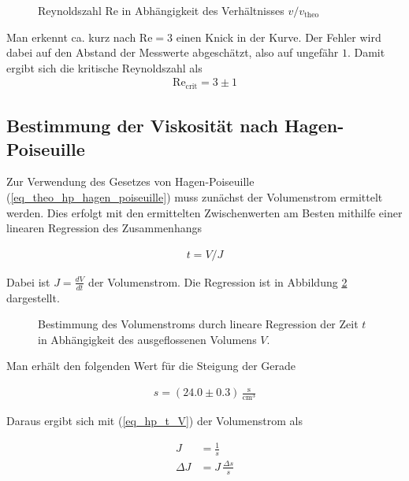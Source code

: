 \documentclass[12pt,a4paper,german]{scrartcl}
\numberwithin{equation}{section}
\begin{document}
  \begin{figure}[h]
    \centering
    \resizebox{0.9\textwidth}{!}{
      
    }
    \caption{Reynoldszahl Re in Abhängigkeit des Verhältnisses $v / v_\text{theo}$}
    \label{fig_reynolds}
  \end{figure}

  Man erkennt ca. kurz nach $\text{Re} = 3$ einen Knick in der Kurve. Der Fehler wird dabei auf den Abstand der Messwerte abgeschätzt, also auf ungefähr $1$. Damit ergibt sich die kritische Reynoldszahl als
  \begin{align}
    \text{Re}_\text{crit} = 3 \pm 1
  \end{align}

  \subsection{Bestimmung der Viskosität nach Hagen-Poiseuille}
  Zur Verwendung des Gesetzes von Hagen-Poiseuille (\ref{eq_theo_hp_hagen_poiseuille}) muss zunächst der Volumenstrom ermittelt werden.
  Dies erfolgt mit den ermittelten Zwischenwerten am Besten mithilfe einer linearen Regression des Zusammenhangs

  \begin{align}
    t = V / J
    \label{eq_hp_t_V}
  \end{align}

  Dabei ist $J = \frac{d V}{d t}$ der Volumenstrom. Die Regression ist in Abbildung \ref{fig_hp_volume_flow} dargestellt.

  \begin{figure}[h]
    \centering
    \resizebox{0.9\textwidth}{!}{
      
    }
    \caption{Bestimmung des Volumenstroms durch lineare Regression der Zeit $t$ in Abhängigkeit des ausgeflossenen Volumens $V$.}
    \label{fig_hp_volume_flow}
  \end{figure}

  Man erhält den folgenden Wert für die Steigung der Gerade

  \begin{align}
    s = (24.0 \pm 0.3) \, \frac{\text{s}}{\text{cm}^3}
  \end{align}

  Daraus ergibt sich mit (\ref{eq_hp_t_V}) der Volumenstrom als

  \begin{align}
    J &= \frac{1}{s} \nonumber \\
    \Delta J &= J \, \frac{\Delta s}{s}
  \end{align}
\end{document}
